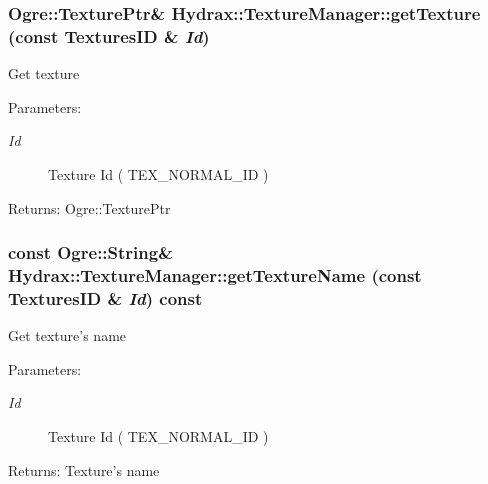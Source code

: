 \begin{CompactItemize}
{\subsubsection[{getTexture}]{\setlength{\rightskip}{0pt plus 5cm}Ogre::TexturePtr\& Hydrax::TextureManager::getTexture (const {\bf TexturesID} \& {\em Id})}}
\label{class_hydrax_1_1_texture_manager_7f15f24a8ff1372f6a1840c27aec655f}


Get texture \begin{Desc}
\item[Parameters:]
\begin{description}
\item[{\em Id}]Texture Id ( TEX\_\-NORMAL\_\-ID ) \end{description}
\end{Desc}
\begin{Desc}
\item[Returns:]Ogre::TexturePtr \end{Desc}
\hypertarget{class_hydrax_1_1_texture_manager_ba3bf13c7d3971c9cbf2b32c650d906e}{
\subsubsection[{getTextureName}]{\setlength{\rightskip}{0pt plus 5cm}const Ogre::String\& Hydrax::TextureManager::getTextureName (const {\bf TexturesID} \& {\em Id}) const}}
\label{class_hydrax_1_1_texture_manager_ba3bf13c7d3971c9cbf2b32c650d906e}


Get texture's name \begin{Desc}
\item[Parameters:]
\begin{description}
\item[{\em Id}]Texture Id ( TEX\_\-NORMAL\_\-ID ) \end{description}
\end{Desc}
\begin{Desc}
\item[Returns:]Texture's name \end{Desc}
\hypertarget{class_hydrax_1_1_texture_manager_d6164d9f44096b59b15c92223be0752a}{
}
\end{CompactItemize}
